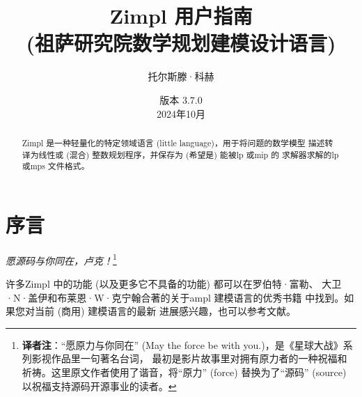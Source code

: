 \documentclass[11pt]{ctexart} %
\newcommand{\zimpl}{{\sc Zimpl}\xspace}
\newcommand{\lp}{{\sc lp}\xspace}
\newcommand{\mip}{{\sc mip}\xspace}
\newcommand{\mps}{{\sc mps}\xspace}
\newcommand{\lpf}{{\sc lp}\xspace}
\newcommand{\ampl}{{\sc ampl}\xspace}
\begin{document}

\title{
\LARGE\zimpl 用户指南\\
\normalsize (祖萨研究院数学规划建模设计语言)\\
}
\author{托尔斯滕·科赫}
\date{\small 版本 3.7.0\\2024年10月}
\maketitle
%
\tableofcontents
\newpage
\begin{abstract}
  \zimpl 是一种轻量化的特定领域语言 (little language)，用于将问题的数学模型
  描述转译为线性或 (混合) 整数规划程序，并保存为 (希望是) 能被\lp 或\mip 的
  求解器求解的\lpf 或\mps 文件格式。
\end{abstract}


\section{序言}
\begin{flushright}
{\em 愿源码与你同在，卢克！}\footnote{\textbf{译者注}：“愿原力与你同在” 
(May the force be with you.)，是《星球大战》系列影视作品里一句著名台词，
最初是影片故事里对拥有原力者的一种祝福和祈祷。这里原文作者使用了谐音，将“原力”
(force) 替换为了“源码” (source) 以祝福支持源码开源事业的读者。}
\end{flushright}
许多\zimpl 中的功能 (以及更多它不具备的功能) 都可以在罗伯特·富勒、
大卫·N·盖伊和布莱恩·W·克宁翰合著的关于\ampl 建模语言的优秀书籍
\cite{FourierGayKernighan2003} 中找到。如果您对当前 (商用) 建模语言的最新
进展感兴趣，也可以参考文献\cite{Kallrath2004}。
\end{document}
